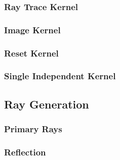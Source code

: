 \documentclass[final]{cmpreport}
\begin{document}
\subsubsection{Ray Trace Kernel}

\subsubsection{Image Kernel}

\subsubsection{Reset Kernel}

\subsubsection{Single Independent Kernel}

\subsection{Ray Generation}

\subsubsection{Primary Rays}

\subsubsection{Reflection}
\end{document}
